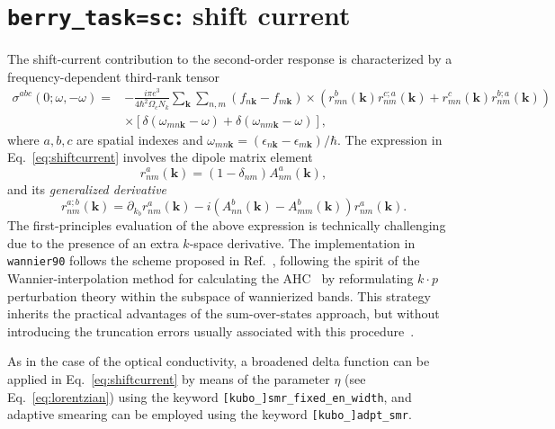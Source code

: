 \section{{\tt berry\_task=sc}: shift current}


The shift-current contribution to the second-order response
is characterized by a frequency-dependent third-rank tensor~\cite{sipe-prb00}
\begin{equation}\label{eq:shiftcurrent}
\begin{split}
\sigma^{abc}(0;\omega,-\omega)=&-\frac{i\pi e^3}{4\hbar^2 \Omega_c N_k}
\sum_{\bm{k}} \sum_{n,m}(f_{n\bm{k}}-f_{m\bm{k}})
\times
\left(r^b_{ mn}(\bm{k})r^{c;a}_{nm}(\bm{k}) + r^c_{mn}(\bm{k})r^{b;a}_{ nm}(\bm{k})\right)\\
&\times \left[\delta(\omega_{mn\bm{k}}-\omega)+\delta(\omega_{nm\bm{k}}-\omega)\right],
\end{split}
\end{equation}
where $a,b,c$ are spatial indexes
and $\omega_{mn\bm{k}}=(\epsilon_{n\bm{k}}-\epsilon_{m\bm{k}})/\hbar$.
The expression in Eq.~\ref{eq:shiftcurrent} involves 
the dipole matrix element 
\begin{equation}
\label{eq:r}
r^a_{ nm}(\bm{k})=(1-\delta_{nm})A^a_{ nm}(\bm{k}),
\end{equation}
and its \emph{generalized
derivative}
%
\begin{equation}
\label{eq:gen-der}
r^{a;b}_{nm}(\bm{k})=\partial_{k_{b}} r^a_{nm}(\bm{k})
-i\left(A^b_{nn}(\bm{k})-A^b_{ mm}(\bm{k})\right)r^a_{ nm}(\bm{k}).
\end{equation}
The first-principles evaluation of the
above expression is technically challenging
due to the presence of an extra $k$-space derivative.
The implementation in {\tt wannier90} follows the scheme proposed in Ref.~\cite{ibanez-azpiroz_ab_2018}, 
following the spirit of the Wannier-interpolation 
method for calculating the AHC~\cite{wang-prb06} by reformulating $k\cdot p$
perturbation theory within the subspace of wannierized bands.
This strategy inherits the practical advantages of the sum-over-states
approach, but without introducing the truncation errors usually associated with this procedure~\cite{sipe-prb00}.

As in the case of the optical conductivity, a broadened delta function can be 
applied in Eq.~\ref{eq:shiftcurrent} by means of the parameter
$\eta$ (see Eq.~\ref{eq:lorentzian}) using the keyword 
{\tt[kubo\_]smr\_fixed\_en\_width}, and adaptive smearing can 
be employed using the keyword {\tt [kubo\_]adpt\_smr}. 

